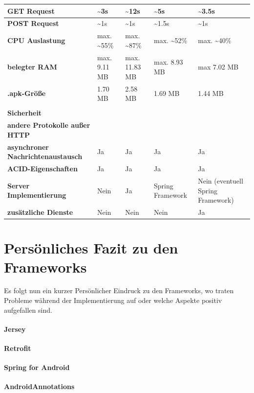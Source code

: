 \begin{landscape}
\begin{longtable}{ m{3.5cm}|m{4.5cm}|m{4.5cm}|m{4.5cm}|m{4.5cm}}
	  \textbf{GET Request} & \textasciitilde3s & \textasciitilde12s  & \textasciitilde5s & \textasciitilde3.5s\\ \hline
	  
	  \textbf{POST Request} & \textasciitilde1s &  \textasciitilde1s & \textasciitilde1.5s & \textasciitilde1s \\ \hline
	  
	  \textbf{CPU Auslastung} & max. \textasciitilde55\%  & max. \textasciitilde87\% & max. \textasciitilde52\% & max. \textasciitilde40\%\\ \hline
	  \textbf{belegter RAM} & max. 9.11 MB & max. 11.83 MB & max. 8.93 MB & max 7.02 MB \\ \hline
	  \textbf{.apk-Größe} & 1.70 MB & 2.58 MB & 1.69 MB & 1.44 MB \\ \hhline{=====}

	   \multicolumn{5}{c}{\textbf{Erweiterte Technische Fähigkeiten}} \\ \hhline{=====}
	   \textbf{Sicherheit} & \\ \hline
	   \textbf{andere Protokolle außer HTTP} & \\ \hline
	   \textbf{asynchroner Nachrichtenaustausch} & Ja & Ja & Ja & Ja \\ \hline
	   \textbf{ACID-Eigenschaften} & Ja & Ja & Ja & Ja \\ \hline
	   \textbf{Server Implementierung} & Nein & Ja &  Spring Framework & Nein (eventuell Spring Framework) \\ \hline
	   \textbf{zusätzliche Dienste} & Nein & Nein & Nein & Ja \\ \hline
 
\end{longtable}
\end{landscape}

\section{Persönliches Fazit zu den Frameworks}
Es folgt nun ein kurzer Persönlicher Eindruck zu den Frameworks, wo traten Probleme während der Implementierung auf oder welche Aspekte positiv aufgefallen sind.
\\\\
\textbf{Jersey}
\\\\
\textbf{Retrofit}
\\\\
\textbf{Spring for Android}
\\\\
\textbf{AndroidAnnotations}
\\\\